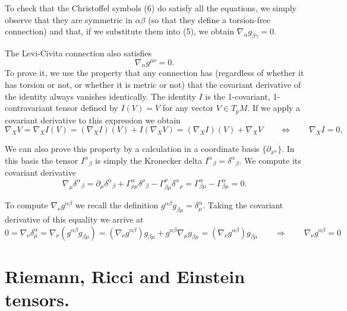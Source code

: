 \begin{points}
\item To check that the Christoffel symbols (6) do satisfy all the equations, we simply observe that they are symmetric in $\alpha\beta$ (so that they define a torsion-free connection) and that, if we substitute them into (5), we obtain $\nabla_\alpha g_{\beta\gamma}=0$.

\item The Levi-Civita connection also satisfies
\[
  \nabla_\alpha g^{\mu\nu}=0 .
\]
To prove it, we use the property that any connection has (regardless of whether it has torsion or not, or whether it is metric or not) that the covariant derivative of the identity always vanishes identically. The identity $I$ is the 1-covariant, 1-contravariant tensor defined by $I(V)=V$ for any vector $V\in T_pM$. If we apply a covariant derivative to this expression we obtain
\[
  \nabla_XV=\nabla_XI(V)=(\nabla_XI)(V)+I(\nabla_XV)=(\nabla_XI)(V)+\nabla_XV\qquad\Longleftrightarrow\qquad\nabla_XI=0,
\]

\item We can also prove this property by a calculation in a coordinate basis $\{\partial_{x^\alpha}\}$. In this basis the tensor $I^\alpha{}_\beta$ is simply the Kronecker delta $I^\alpha{}_\beta=\delta^\alpha{}_\beta$. We compute its covariant derivative
\[
  \nabla_\mu\delta^\alpha{}_\beta=\partial_\mu\delta^\alpha{}_\beta+\Gamma^\alpha_{\rho\mu}\delta^\rho{}_\beta-\Gamma^\rho_{\beta\mu}\delta^\alpha{}_\rho=\Gamma^\alpha_{\beta\mu}-\Gamma^\alpha_{\beta\mu}=0 .
\]

\item To compute $\nabla_\nu g^{\alpha\beta}$ we recall the definition $g^{\alpha\beta}g_{\beta\mu}=\delta^\alpha_\mu$. Taking the covariant derivative of this equality we arrive at
\[
  0=\nabla_\nu\delta^\alpha_\mu=\nabla_\nu(g^{\alpha\beta}g_{\beta\mu})=(\nabla_\nu g^{\alpha\beta})g_{\beta\mu}+g^{\alpha\beta}\nabla_\mu g_{\beta\mu}=(\nabla_\nu g^{\alpha\beta})g_{\beta\mu}\qquad\Longrightarrow\qquad\nabla_\nu g^{\alpha\beta}=0
\]
\end{points}


\section{Riemann, Ricci and Einstein tensors.}

